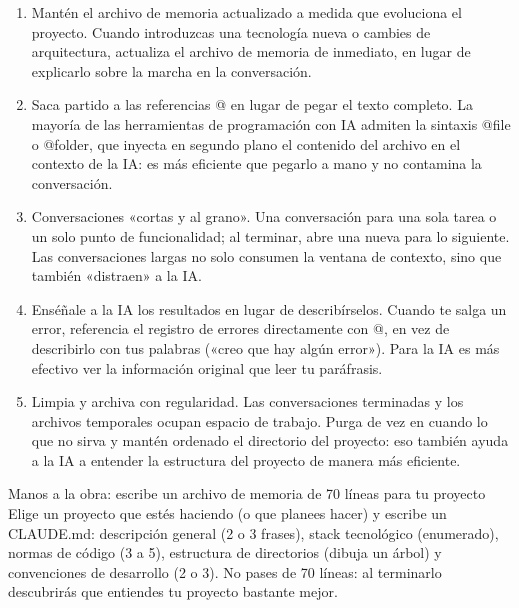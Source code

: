 \begin{enumerate}
  \item Mantén el archivo de memoria actualizado a medida que evoluciona el proyecto. Cuando introduzcas una tecnología nueva o cambies de arquitectura, actualiza el archivo de memoria de inmediato, en lugar de explicarlo sobre la marcha en la conversación.
  \item Saca partido a las referencias @ en lugar de pegar el texto completo. La mayoría de las herramientas de programación con IA admiten la sintaxis @file o @folder, que inyecta en segundo plano el contenido del archivo en el contexto de la IA: es más eficiente que pegarlo a mano y no contamina la conversación.
  \item Conversaciones «cortas y al grano». Una conversación para una sola tarea o un solo punto de funcionalidad; al terminar, abre una nueva para lo siguiente. Las conversaciones largas no solo consumen la ventana de contexto, sino que también «distraen» a la IA.
  \item Enséñale a la IA los resultados en lugar de describírselos. Cuando te salga un error, referencia el registro de errores directamente con @, en vez de describirlo con tus palabras («creo que hay algún error»). Para la IA es más efectivo ver la información original que leer tu paráfrasis.
  \item Limpia y archiva con regularidad. Las conversaciones terminadas y los archivos temporales ocupan espacio de trabajo. Purga de vez en cuando lo que no sirva y mantén ordenado el directorio del proyecto: eso también ayuda a la IA a entender la estructura del proyecto de manera más eficiente.
\end{enumerate}

\begin{tcbpractice}{Manos a la obra: escribe un archivo de memoria de 70 líneas para tu proyecto}
Elige un proyecto que estés haciendo (o que planees hacer) y escribe un CLAUDE.md: descripción general (2 o 3 frases), stack tecnológico (enumerado), normas de código (3 a 5), estructura de directorios (dibuja un árbol) y convenciones de desarrollo (2 o 3). No pases de 70 líneas: al terminarlo descubrirás que entiendes tu proyecto bastante mejor.

\end{tcbpractice}

